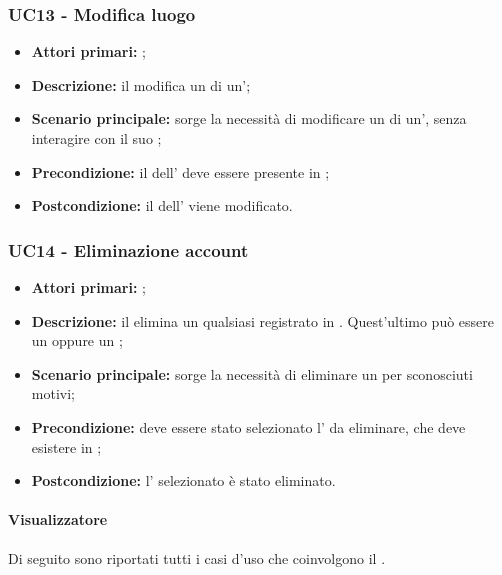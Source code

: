 \documentclass[../analisi-dei-requisiti]{subfiles}
\begin{document}
\subsubsection{UC13 - Modifica luogo}
\label{subsub:UC13}

\begin{itemize}
  \item \textbf{Attori primari:} ;
  \item \textbf{Descrizione:} il  modifica un  di un';
  \item \textbf{Scenario principale:} sorge la necessità di modificare un  di un', senza interagire con il suo ;
  \item \textbf{Precondizione:} il  dell' deve essere presente in ;
  \item \textbf{Postcondizione:} il  dell' viene modificato.

\end{itemize}

\subsubsection{UC14 - Eliminazione account}
\label{subsub:UC14}

\begin{itemize}
  \item \textbf{Attori primari:} ;
  \item \textbf{Descrizione:} il  elimina un qualsiasi  registrato in . Quest'ultimo può essere un  oppure un ;
  \item \textbf{Scenario principale:} sorge la necessità di eliminare un  per sconosciuti motivi;
  \item \textbf{Precondizione:} deve essere stato selezionato l' da eliminare, che deve esistere in ;
  \item \textbf{Postcondizione:} l' selezionato è stato eliminato.

\end{itemize}



\paragraph{Visualizzatore}
Di seguito sono riportati tutti i casi d'uso che coinvolgono il  .
\end{document}
